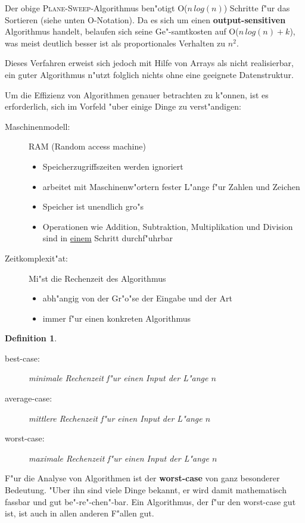 \documentclass[draft,12pt]{scrreprt}
\theoremstyle{break}
\newtheorem{definition}{Definition}
\begin{document}
Der obige \textsc{Plane-Sweep}-Algorithmus ben"otigt O($n\,log(n)$) Schritte
f"ur das Sortieren (siehe unten O-Notation). Da es sich um einen \textbf{output-sensitiven}
Algorithmus handelt, belaufen sich seine Ge"-samtkosten auf
O($n\,log(n)+k$), was meist deutlich besser ist als proportionales Verhalten
zu $n^2$.

Dieses Verfahren erweist sich jedoch mit Hilfe von Arrays als nicht
realisierbar, ein guter Algorithmus n"utzt folglich nichts ohne eine
geeignete Datenstruktur.

Um die Effizienz von Algorithmen genauer betrachten zu k"onnen, ist es
erforderlich, sich im Vorfeld "uber einige Dinge zu verst"andigen:

\begin{description}
 \item[Maschinenmodell:] RAM (Random access machine)
  \begin{itemize}
   \item Speicherzugriffszeiten werden ignoriert
   \item arbeitet mit Maschinenw"ortern fester L"ange f"ur Zahlen und Zeichen
   \item Speicher ist unendlich gro"s
   \item Operationen wie Addition, Subtraktion, Multiplikation und Division
    sind in \underline{einem} Schritt durchf"uhrbar
  \end{itemize}
 \item[Zeitkomplexit"at:] Mi"st die Rechenzeit des Algorithmus
  \begin{itemize}
   \item{abh"angig von der Gr"o"se der Eingabe und der Art}
   \item{immer f"ur einen konkreten Algorithmus}
  \end{itemize}
\end{description}

\begin{definition}
  \begin{description}
   \item[best-case:] minimale Rechenzeit f"ur einen Input der L"ange $n$
   \item[average-case:] mittlere Rechenzeit f"ur einen Input der L"ange $n$
   \item[worst-case:] maximale Rechenzeit f"ur einen Input der L"ange $n$
  \end{description}
\end{definition}

F"ur die Analyse von Algorithmen ist der \textbf{worst-case} von ganz
besonderer Bedeutung. "Uber ihn sind viele Dinge bekannt, er wird
damit mathematisch fassbar und gut be"-re"-chen"-bar. Ein Algorithmus,
der f"ur den worst-case gut ist, ist auch in allen anderen F"allen gut.
\end{document}
